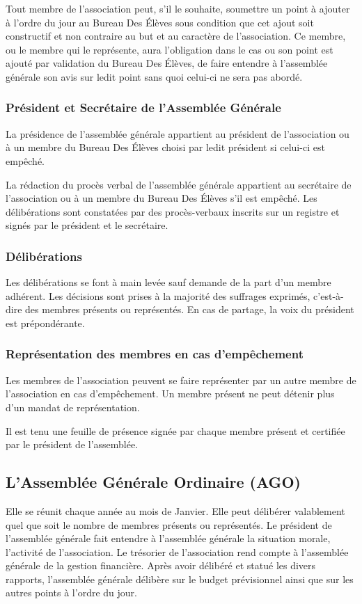 \documentclass{article}
\begin{document}
				Tout membre de l'association peut, s'il le souhaite, soumettre
				un point à ajouter à l'ordre du jour au Bureau Des Élèves sous
				condition que cet ajout soit constructif et non contraire au but
				et au caractère de l'association. Ce membre, ou le membre qui le
				représente, aura l'obligation dans le cas ou son point est
				ajouté par validation du Bureau Des Élèves, de faire entendre à
				l'assemblée générale son avis sur ledit point sans quoi celui-ci
				ne sera pas abordé.

			\subsubsection{Président et Secrétaire de l’Assemblée Générale}
				La présidence de l’assemblée générale appartient au président de
				l’association ou à un membre du Bureau Des Élèves choisi par ledit
				président si celui-ci est empêché.

				La rédaction du procès verbal de l’assemblée générale appartient au
				secrétaire de l’association ou à un membre du Bureau Des Élèves s’il
				est empêché. Les délibérations sont constatées par des procès-verbaux
				inscrits sur un registre et signés par le président et le secrétaire.

			\subsubsection{Délibérations}
				Les délibérations se font à main levée sauf demande de la part d’un
				membre adhérent. Les décisions sont prises à la majorité des
				suffrages exprimés, c’est-à-dire des membres présents ou représentés.
				En cas de partage, la voix du président est prépondérante. 

			\subsubsection{Représentation des membres en cas d’empêchement}
				Les membres de l’association peuvent se faire représenter par un
				autre membre de l’association en cas d’empêchement. Un membre présent
				ne peut détenir plus d’un mandat de représentation.

				Il est tenu une feuille de présence signée par chaque membre présent
				et certifiée par le président de l’assemblée.

		\subsection{L’Assemblée Générale Ordinaire (AGO)}
			Elle se réunit chaque année au mois de Janvier. Elle peut délibérer
			valablement quel que soit le nombre de membres présents ou représentés.
			Le président de l’assemblée générale fait entendre à l’assemblée générale
			la situation morale, l’activité de l’association. Le trésorier de
			l’association rend compte à l’assemblée générale de la gestion
			financière. Après avoir délibéré et statué les divers rapports,
			l’assemblée générale délibère sur le budget prévisionnel ainsi que sur
			les autres points à l’ordre du jour. 
\end{document}
